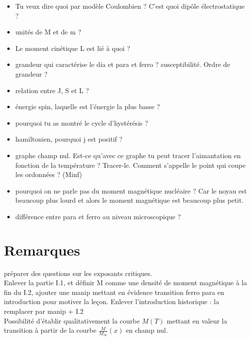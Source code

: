 \documentclass[12pt,prb,aps,epsf]{article}
\begin{document}
\begin{itemize}
	
	\item Tu veux dire quoi par modèle Coulombien ? C'est quoi dipôle électrostatique ?
	\item unités de M et de m ? 
	\item Le moment cinétique L est lié à quoi ? 
	\item grandeur qui caractérise le dia et para et ferro ? susceptibilité. Ordre de grandeur ?
	\item relation entre J, S et L ?
	\item énergie spin, laquelle est l'énergie la plus basse ?
	\item pourquoi tu as montré le cycle d'hystérésis ? 
	\item hamiltonien, pourquoi j est positif ?
	\item graphe champ nul. Est-ce qu'avec ce graphe tu peut tracer l'aimantation en fonction de la température ? Tracer-le. Comment s'appelle le point qui coupe les ordonnées ? (Minf)
	\item pourquoi on ne parle pas du moment magnétique nucléaire ? Car le noyau est beaucoup plus lourd et alors le moment magnétique est beaucoup plus petit.
	\item différence entre para et ferro au niveau microscopique ? 
\end{itemize}

\section*{Remarques}
	préparer des questions sur les exposants critiques.\\
	Enlever la partie I.1, et définir M comme une densité de moment magnétique à la fin du I.2, ajouter une manip mettant en évidence transition ferro para en introduction pour motiver la leçon. Enlever l'introduction historique : la remplacer par manip + I.2\\
	Possibilité d'établir qualitativement la courbe $M(T)$ mettant en valeur la transition à partir de la courbe $\frac{M}{M_{\infty}}(x)$ en champ nul.
\end{document}
